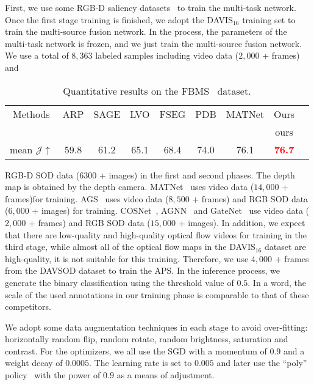 \documentclass[sigconf]{acmart}
\newcommand{\textBC}[2]{\textbf{\textcolor{#1}{#2}}}
\begin{document}
First, we use some RGB-D saliency datasets~\cite{early_fusion_1,NJU2000,SIP,RGBD135,STERE,DMRA} to train the multi-task network. Once the first stage training is finished, we adopt the DAVIS$_{16}$ training set to train the multi-source fusion network. In the process, the parameters of the multi-task network is frozen, and we just train the multi-source fusion network. 
We use a total of $8,363$ labeled samples including video data ($2,000$ + frames) and 
\begin{table}[t]
	\small
	\centering
	\setlength{\tabcolsep}{0.3em}	
	 \setlength{\abovecaptionskip}{3pt}
	\caption{Quantitative results on the FBMS~\cite{FBMS} dataset.}
\begin{tabular}{c||cccccccc}
	\hline
	Methods	& ARP& SAGE & LVO& FSEG & PDB & MATNet&Ours\\ 
	&~\cite{ARP}&~\cite{SAGE}&~\cite{LVO}&~\cite{FSEG}&~\cite{PDB}&~\cite{MATNet}&ours\\\hline
	mean $\mathcal{J}\uparrow$ & 59.8 & 61.2& 65.1& 68.4& 74.0& 76.1&\textBC{red}{76.7}\\
	\hline
	\end{tabular}
	\vspace{-5mm}
	\label{table:Table3}	
\end{table}
RGB-D SOD data ($6300$ + images) in the first and second phases. The depth map is obtained by the depth camera. MATNet~\cite{MATNet} uses video data ($14,000$ + frames)for training. AGS~\cite{AGS} uses video data ($8,500$ + frames) and RGB SOD data ($6,000$ + images) for training. COSNet~\cite{COSNet}, AGNN~\cite{AGNN} and GateNet~\cite{GateNet} use video data ($2,000$ + frames) and RGB SOD data ($15,000$ + images). In addition, we expect that there are low-quality and high-quality optical flow videos for training in the third stage, while almost all of the optical flow maps in the DAVIS$_{16}$ dataset are high-quality, it is not suitable for this training. Therefore, we use $4,000$ + frames from the DAVSOD dataset to train the APS. In the inference process, we generate the binary classification using the threshold value of $0.5$. In a word, the scale of the used annotations in our training phase is comparable to that of these competitors. 

We adopt some data augmentation techniques in each stage to avoid over-fitting: horizontally random flip, random rotate, random brightness, saturation and contrast. For the optimizers, we all use the SGD with a momentum of $0.9$ and a weight decay of $0.0005$. The learning rate is set to $0.005$ and later use the ``poly'' policy~\cite{poly} with the power of $0.9$ as a means of adjustment.
\end{document}
